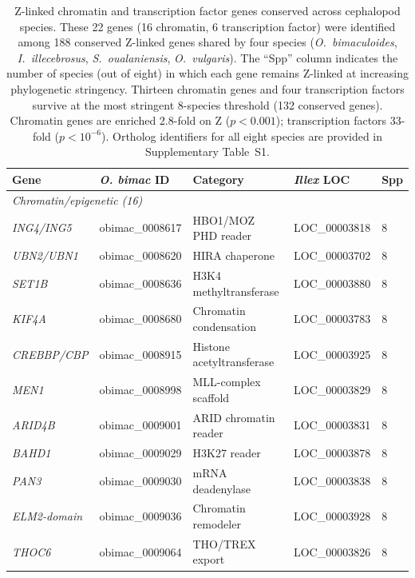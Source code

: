 \documentclass[12pt]{article}
\begin{document}
\begin{table}[H]
\centering
\caption{Z-linked chromatin and transcription factor genes conserved across cephalopod species.
These 22 genes (16 chromatin, 6 transcription factor) were identified among 188 conserved Z-linked genes
shared by four species (\textit{O.~bimaculoides}, \textit{I.~illecebrosus}, \textit{S.~oualaniensis},
\textit{O.~vulgaris}). The ``Spp'' column indicates the number of species (out of eight) in which each gene
remains Z-linked at increasing phylogenetic stringency. Thirteen chromatin genes and four transcription
factors survive at the most stringent 8-species threshold (132 conserved genes).
Chromatin genes are enriched 2.8-fold on Z ($p < 0.001$); transcription factors 33-fold ($p < 10^{-6}$).
Ortholog identifiers for all eight species are provided in Supplementary Table~S1.}
\label{tab:conserved_z_genes}
\begin{tabular}{lllll}
\toprule
\textbf{Gene} & \textbf{\textit{O. bimac} ID} & \textbf{Category} & \textbf{\textit{Illex} LOC} & \textbf{Spp} \\
\midrule
\multicolumn{5}{l}{\textit{Chromatin/epigenetic (16)}} \\
\addlinespace[2pt]
\textit{ING4/ING5}    & obimac\_0008617 & HBO1/MOZ PHD reader        & LOC\_00003818 & 8 \\
\textit{UBN2/UBN1}    & obimac\_0008620 & HIRA chaperone            & LOC\_00003702 & 8 \\
\textit{SET1B}        & obimac\_0008636 & H3K4 methyltransferase     & LOC\_00003880 & 8 \\
\textit{KIF4A}        & obimac\_0008680 & Chromatin condensation     & LOC\_00003783 & 8 \\
\textit{CREBBP/CBP}   & obimac\_0008915 & Histone acetyltransferase  & LOC\_00003925 & 8 \\
\textit{MEN1}         & obimac\_0008998 & MLL-complex scaffold       & LOC\_00003829 & 8 \\
\textit{ARID4B}       & obimac\_0009001 & ARID chromatin reader      & LOC\_00003831 & 8 \\
\textit{BAHD1}        & obimac\_0009029 & H3K27 reader               & LOC\_00003878 & 8 \\
\textit{PAN3}         & obimac\_0009030 & mRNA deadenylase           & LOC\_00003838 & 8 \\
\textit{ELM2-domain}  & obimac\_0009036 & Chromatin remodeler        & LOC\_00003928 & 8 \\
\textit{THOC6}        & obimac\_0009064 & THO/TREX export            & LOC\_00003826 & 8 \\

\end{tabular}
\end{table}
\end{document}
